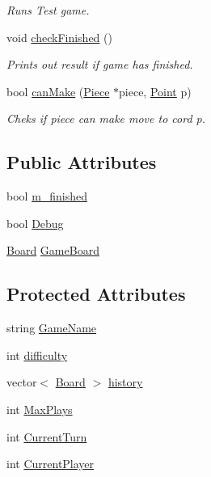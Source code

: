 \begin{DoxyCompactItemize}
\begin{DoxyCompactList}\small\item\em Runs Test game. \end{DoxyCompactList}\item 
\hypertarget{class_game_ae5be70ea28f2ec151cd93e86086f23a9}{void \hyperlink{class_game_ae5be70ea28f2ec151cd93e86086f23a9}{check\-Finished} ()}\label{class_game_ae5be70ea28f2ec151cd93e86086f23a9}

\begin{DoxyCompactList}\small\item\em Prints out result if game has finished. \end{DoxyCompactList}\item 
\hypertarget{class_game_a37edad1c1ded84b1735653f809ccb585}{bool \hyperlink{class_game_a37edad1c1ded84b1735653f809ccb585}{can\-Make} (\hyperlink{class_piece}{Piece} $\ast$piece, \hyperlink{struct_point}{Point} p)}\label{class_game_a37edad1c1ded84b1735653f809ccb585}

\begin{DoxyCompactList}\small\item\em Cheks if piece can make move to cord p. \end{DoxyCompactList}\end{DoxyCompactItemize}
\subsection*{Public Attributes}
\begin{DoxyCompactItemize}
\item 
bool \hyperlink{class_game_aee0b70deb19422d35b2061beb339bdf8}{m\-\_\-finished}
\item 
bool \hyperlink{class_game_ad79740c2d2fa299cf322bf6ea322d9aa}{Debug}
\item 
\hyperlink{class_board}{Board} \hyperlink{class_game_aeb67bc4fc06221330cfd7c862c85b66d}{Game\-Board}
\end{DoxyCompactItemize}
\subsection*{Protected Attributes}
\begin{DoxyCompactItemize}
\item 
string \hyperlink{class_game_a1b56d5db37d900da0911378cc01f4cad}{Game\-Name}
\item 
int \hyperlink{class_game_a536a6390d16f05d402928bd731e06ef3}{difficulty}
\item 
vector$<$ \hyperlink{class_board}{Board} $>$ \hyperlink{class_game_a7c0dd74fa2e5c366638596b7e82428f1}{history}
\item 
int \hyperlink{class_game_a53cb9be6604469db6b3abac24c5a2ab6}{Max\-Plays}
\item 
int \hyperlink{class_game_a88700a4643e08b12130ba2950c54ed8b}{Current\-Turn}
\item 
int \hyperlink{class_game_a661282d67a0e4a972293c98478bc02e4}{Current\-Player}
\end{DoxyCompactItemize}


